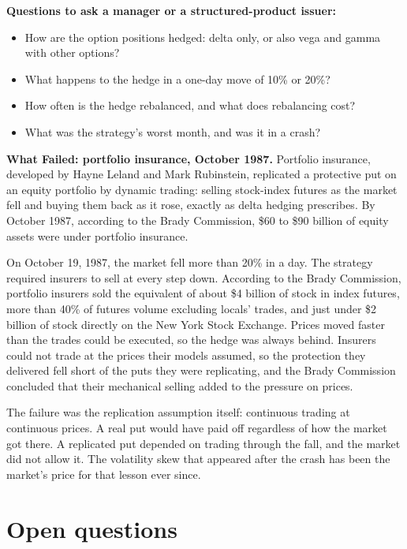\textbf{Questions to ask a manager or a structured-product issuer:}

\begin{itemize}
  \item How are the option positions hedged: delta only, or also vega and gamma with other options?
  \item What happens to the hedge in a one-day move of 10\% or 20\%?
  \item How often is the hedge rebalanced, and what does rebalancing cost?
  \item What was the strategy's worst month, and was it in a crash?
\end{itemize}

\begin{callout}
\textbf{What Failed: portfolio insurance, October 1987.} Portfolio insurance, developed by Hayne Leland and Mark Rubinstein, replicated a protective put on an equity portfolio by dynamic trading: selling stock-index futures as the market fell and buying them back as it rose, exactly as delta hedging prescribes. By October 1987, according to the Brady Commission, \$60 to \$90 billion of equity assets were under portfolio insurance.

On October 19, 1987, the market fell more than 20\% in a day. The strategy required insurers to sell at every step down. According to the Brady Commission, portfolio insurers sold the equivalent of about \$4 billion of stock in index futures, more than 40\% of futures volume excluding locals' trades, and just under \$2 billion of stock directly on the New York Stock Exchange. Prices moved faster than the trades could be executed, so the hedge was always behind. Insurers could not trade at the prices their models assumed, so the protection they delivered fell short of the puts they were replicating, and the Brady Commission concluded that their mechanical selling added to the pressure on prices.

The failure was the replication assumption itself: continuous trading at continuous prices. A real put would have paid off regardless of how the market got there. A replicated put depended on trading through the fall, and the market did not allow it. The volatility skew that appeared after the crash has been the market's price for that lesson ever since.
\end{callout}

\section{Open questions}
\label{sec:17-open}

